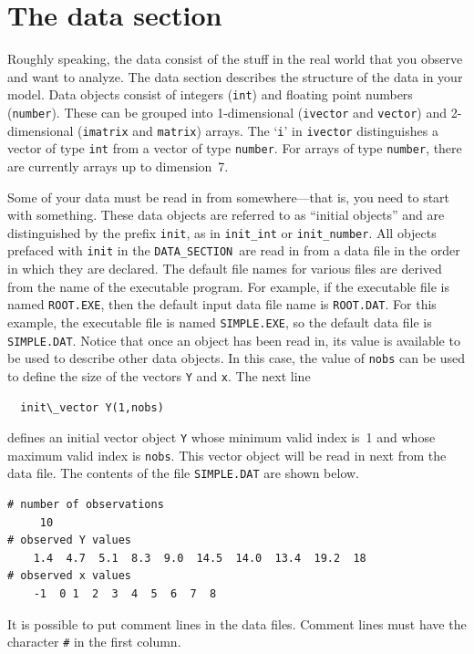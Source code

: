 \documentclass{admbmanual}
\newcommand\DS{\texttt{DATA\_SECTION}}
\begin{document}
\section{The data section}

Roughly speaking, the data consist of the stuff in the real
world that you observe and want to analyze. The data section
describes the structure of the data in your model. Data objects 
consist of integers (\texttt{int}) and floating point numbers (\texttt{number}). 
These can be grouped into 1-dimensional (\texttt{ivector} and \texttt{vector}) 
and 2-dimensional (\texttt{imatrix} and \texttt{matrix}) arrays.
The `\texttt{i}' in \texttt{ivector} distinguishes a vector of
type \texttt{int} from a vector of type \texttt{number}.
For arrays of type \texttt{number}, there are currently arrays up to dimension~7.

Some of your data must be read in from somewhere---that is,
you need to start with something. These data objects are 
referred to as ``initial objects'' and are
distinguished by the prefix \texttt{init}, as in \texttt{init\_int}
or \texttt{init\_number}.
All objects prefaced with \texttt{init} in the \DS\ are 
read in from a data file in the order in which they are declared. 
The default file names for various files are derived from the
name of the executable program. For example, if the executable file is named
\texttt{ROOT.EXE}, then  the default input data file name is \texttt{ROOT.DAT}. 
For this example, the executable file is named \texttt{SIMPLE.EXE},
so the default data file is \texttt{SIMPLE.DAT}.
Notice that
once an object has been read in, its value is available
to be used to describe other data objects. In this case, the
value of \texttt{nobs} can be used to define the size of the
vectors \texttt{Y} and \texttt{x}. The next line
\begin{lstlisting}
  init\_vector Y(1,nobs)
\end{lstlisting}
defines an initial vector object \texttt{Y} whose minimum valid index is~1
and whose maximum valid index is \texttt{nobs}. This vector
object will be read in next from the data file.
The contents of the file \texttt{SIMPLE.DAT} are shown below. 
\begin{lstlisting}
# number of observations
     10
# observed Y values
    1.4  4.7  5.1  8.3  9.0  14.5  14.0  13.4  19.2  18 
# observed x values
    -1  0 1  2  3  4  5  6  7  8        
\end{lstlisting}
It is possible to put comment lines in the data files.
Comment lines must have the character {\tt\#} in the first
column.
\end{document}
